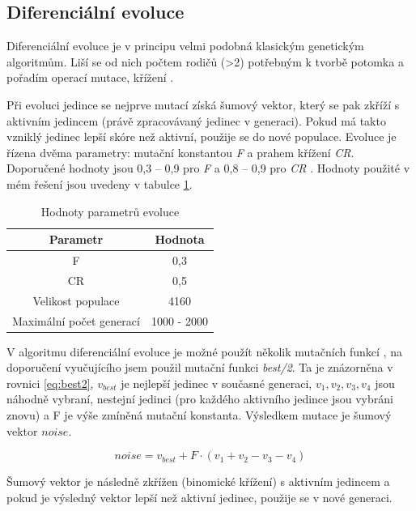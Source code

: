 \documentclass[11pt,a4paper]{scrartcl}
\begin{document}
	\subsection{Diferenciální evoluce}
	Diferenciální evoluce je v principu velmi podobná klasickým genetickým algoritmům. Liší se od nich počtem rodičů (\textgreater2) potřebným k tvorbě potomka a pořadím operací mutace, křížení \cite{hlavacek_de}. 
	
	Při evoluci jedince se nejprve mutací získá šumový vektor, který se pak zkříží s aktivním jedincem (právě zpracovávaný jedinec v generaci). Pokud má takto vzniklý jedinec lepší skóre než aktivní, použije se do nové populace. Evoluce je řízena dvěma parametry: mutační konstantou \textit{F} a prahem křížení \textit{CR}. Doporučené hodnoty jsou 0,3 -- 0,9 pro \textit{F} a 0,8 -- 0,9 pro \textit{CR} \cite{hlavacek_de}. Hodnoty použité v mém řešení jsou uvedeny v tabulce \ref{tab:param-val}.
	
	\begin{table}[H]
		\begin{center}	
			\begin{tabular}{|c|c|}
				\hline
				Parametr & Hodnota \\
				\hline
				\hline
				F & 0,3 \\
				\hline
				CR & 0,5 \\
				\hline 
				Velikost populace & 4160 \\
				\hline
				Maximální počet generací & 1000 - 2000 \\
				\hline
			\end{tabular}
		\end{center}
		\caption{Hodnoty parametrů evoluce}
		\label{tab:param-val}
	\end{table}
	
	V algoritmu diferenciální evoluce je možné použít několik mutačních funkcí \cite{hlavacek_de}, na doporučení vyučujícího jsem použil mutační funkci \textit{best/2}. Ta je znázorněna v rovnici \ref{eq:best2}, $v_{best}$ je nejlepší jedinec v současné generaci, $v_1,v_2,v_3,v_4$ jsou náhodně vybraní, nestejní jedinci (pro každého aktivního jedince jsou vybráni znovu) a F je výše zmíněná mutační konstanta. Výsledkem mutace je šumový vektor $noise$. 
	
	\begin{equation}
		noise = v_{best} + F\cdot(v_1+v_2-v_3-v_4)
		\label{eq:best2}
	\end{equation}
	
		Šumový vektor je následně zkřížen (binomické křížení) s aktivním jedincem a pokud je výsledný vektor lepší než aktivní jedinec, použije se v nové generaci.
	
\end{document}
